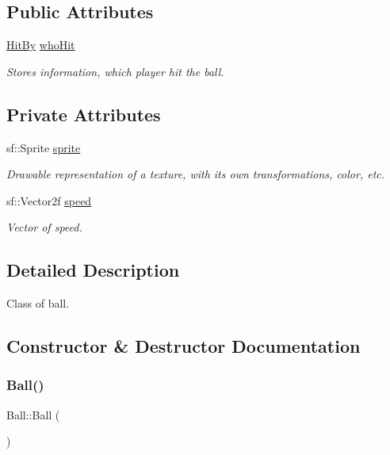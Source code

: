 \subsection*{Public Attributes}
\begin{DoxyCompactItemize}
\item 
\mbox{\hyperlink{_ball_8hpp_ae19cd4d7bfabe0d8dc59e64076cadc00}{Hit\+By}} \mbox{\hyperlink{class_ball_aad64a181e6e7c8e028dddde82403c9e5}{who\+Hit}}
\begin{DoxyCompactList}\small\item\em Stores information, which player hit the ball. \end{DoxyCompactList}\end{DoxyCompactItemize}
\subsection*{Private Attributes}
\begin{DoxyCompactItemize}
\item 
sf\+::\+Sprite \mbox{\hyperlink{class_ball_a16017a7b3ea4c4005046eedecb3fe774}{sprite}}
\begin{DoxyCompactList}\small\item\em Drawable representation of a texture, with its own transformations, color, etc. \end{DoxyCompactList}\item 
sf\+::\+Vector2f \mbox{\hyperlink{class_ball_a827972a1eab3ea7f878b7c86201a674d}{speed}}
\begin{DoxyCompactList}\small\item\em Vector of speed. \end{DoxyCompactList}\end{DoxyCompactItemize}


\subsection{Detailed Description}
Class of ball. 

\subsection{Constructor \& Destructor Documentation}
\mbox{\label{class_ball_a86a144d3dad6c953e422e32435923bbb}} 
\subsubsection{\texorpdfstring{Ball()}{Ball()}}
{\footnotesize\ttfamily Ball\+::\+Ball (\begin{DoxyParamCaption}{ }\end{DoxyParamCaption})\hspace{0.3cm}{\ttfamily [inline]}}



